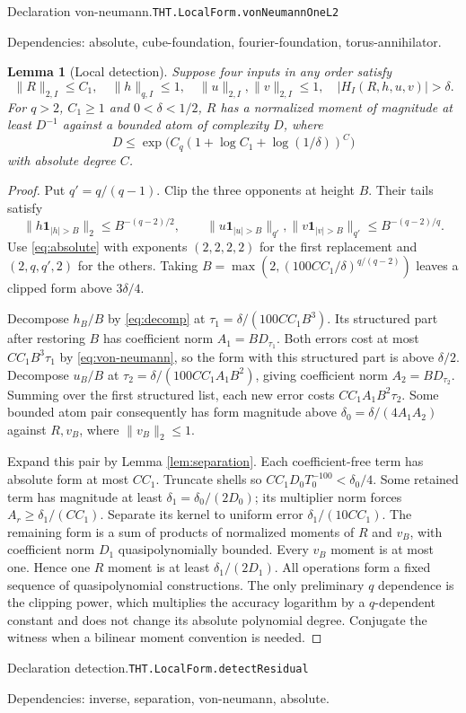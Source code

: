 \documentclass[11pt]{article}
\newtheorem{lemma}[theorem]{Lemma}
\theoremstyle{definition}
\newcommand{\one}{\mathbf 1}
\numberwithin{equation}{section}
\newcommand{\bp}[3]{\par\smallskip\begingroup\footnotesize
\noindent\hypertarget{bp:#1}{\textsf{Declaration #1.}}\quad\nolinkurl{#2}\par
\noindent\textsf{Dependencies:} #3.\par\endgroup\smallskip}
\begin{document}
\bp{von-neumann}{THT.LocalForm.vonNeumannOneL2}{absolute, cube-foundation, fourier-foundation, torus-annihilator}

\begin{lemma}[Local detection]\label{lem:detection}
Suppose four inputs in any order satisfy
\[
 \|R\|_{2,I}\le C_1,\quad \|h\|_{q,I}\le1,\quad
 \|u\|_{2,I},\|v\|_{2,I}\le1,\quad |H_I(R,h,u,v)|>\delta.
\]
For $q>2$, $C_1\ge1$ and $0<\delta<1/2$, $R$ has a normalized moment of magnitude at least $D^{-1}$ against a bounded atom of complexity $D$, where
\[
 D\le\exp\bigl(C_q(1+\log C_1+\log(1/\delta))^C\bigr)
\]
with absolute degree $C$.
\end{lemma}
\begin{proof}
Put $q'=q/(q-1)$. Clip the three opponents at height $B$. Their tails satisfy
\[
 \|h\one_{|h|>B}\|_2\le B^{-(q-2)/2},\qquad
 \|u\one_{|u|>B}\|_{q'},\|v\one_{|v|>B}\|_{q'}\le B^{-(q-2)/q}.
\]
Use \eqref{eq:absolute} with exponents $(2,2,2,2)$ for the first replacement and $(2,q,q',2)$ for the others. Taking $B=\max(2,(100CC_1/\delta)^{q/(q-2)})$ leaves a clipped form above $3\delta/4$.

Decompose $h_B/B$ by \eqref{eq:decomp} at $\tau_1=\delta/(100CC_1B^3)$. Its structured part after restoring $B$ has coefficient norm $A_1=BD_{\tau_1}$. Both errors cost at most $CC_1B^3\tau_1$ by \eqref{eq:von-neumann}, so the form with this structured part is above $\delta/2$. Decompose $u_B/B$ at $\tau_2=\delta/(100CC_1A_1B^2)$, giving coefficient norm $A_2=BD_{\tau_2}$. Summing over the first structured list, each new error costs $CC_1A_1B^2\tau_2$. Some bounded atom pair consequently has form magnitude above $\delta_0=\delta/(4A_1A_2)$ against $R,v_B$, where $\|v_B\|_2\le1$.

Expand this pair by Lemma \ref{lem:separation}. Each coefficient-free term has absolute form at most $CC_1$. Truncate shells so $CC_1D_0T_0^{-100}<\delta_0/4$. Some retained term has magnitude at least $\delta_1=\delta_0/(2D_0)$; its multiplier norm forces $A_r\ge\delta_1/(CC_1)$. Separate its kernel to uniform error $\delta_1/(10CC_1)$. The remaining form is a sum of products of normalized moments of $R$ and $v_B$, with coefficient norm $D_1$ quasipolynomially bounded. Every $v_B$ moment is at most one. Hence one $R$ moment is at least $\delta_1/(2D_1)$. All operations form a fixed sequence of quasipolynomial constructions. The only preliminary $q$ dependence is the clipping power, which multiplies the accuracy logarithm by a $q$-dependent constant and does not change its absolute polynomial degree. Conjugate the witness when a bilinear moment convention is needed.
\end{proof}
\bp{detection}{THT.LocalForm.detectResidual}{inverse, separation, von-neumann, absolute}
\end{document}
